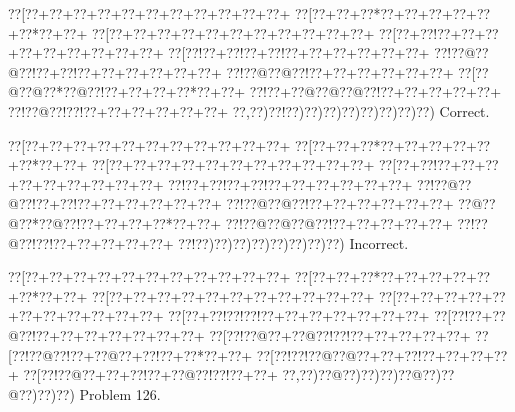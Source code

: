 \documentclass[a5paper]{article}
\begin{document}
\begin{center}
{\goo
\0??[\0??+\0??+\0??+\0??+\0??+\0??+\0??+\0??+\0??+\0??+\0??+
\0??[\0??+\0??+\0??*\0??+\0??+\0??+\0??+\0??+\0??*\0??+\0??+
\0??[\0??+\0??+\0??+\0??+\0??+\0??+\0??+\0??+\0??+\0??+\0??+
\0??[\0??+\0??!\0??+\0??+\0??+\0??+\0??+\0??+\0??+\0??+\0??+
\0??[\0??!\0??+\0??!\0??+\0??!\0??+\0??+\0??+\0??+\0??+\0??+
\0??!\0??@\0??@\0??!\0??+\0??!\0??+\0??+\0??+\0??+\0??+\0??+
\0??!\0??@\0??@\0??!\0??+\0??+\0??+\0??+\0??+\0??+
\0??[\0??@\0??@\0??*\0??@\0??!\0??+\0??+\0??+\0??*\0??+\0??+
\0??!\0??+\0??@\0??@\0??@\0??!\0??+\0??+\0??+\0??+\0??+
\0??!\0??@\0??!\0??!\0??+\0??+\0??+\0??+\0??+\0??+
\0??,\0??)\0??!\0??)\0??)\0??)\0??)\0??)\0??)\0??)\0??)
}
Correct. 

\end{center}
\begin{center}
{\goo
\0??[\0??+\0??+\0??+\0??+\0??+\0??+\0??+\0??+\0??+\0??+\0??+
\0??[\0??+\0??+\0??*\0??+\0??+\0??+\0??+\0??+\0??*\0??+\0??+
\0??[\0??+\0??+\0??+\0??+\0??+\0??+\0??+\0??+\0??+\0??+\0??+
\0??[\0??+\0??!\0??+\0??+\0??+\0??+\0??+\0??+\0??+\0??+\0??+
\0??!\0??+\0??!\0??+\0??!\0??+\0??+\0??+\0??+\0??+\0??+
\0??!\0??@\0??@\0??!\0??+\0??!\0??+\0??+\0??+\0??+\0??+\0??+
\0??!\0??@\0??@\0??!\0??+\0??+\0??+\0??+\0??+\0??+
\0??@\0??@\0??*\0??@\0??!\0??+\0??+\0??+\0??*\0??+\0??+
\0??!\0??@\0??@\0??@\0??!\0??+\0??+\0??+\0??+\0??+
\0??!\0??@\0??!\0??!\0??+\0??+\0??+\0??+\0??+
\0??!\0??)\0??)\0??)\0??)\0??)\0??)\0??)\0??)
}
Incorrect. 

\end{center}
\newpage
\begin{center}
{\goo
\0??[\0??+\0??+\0??+\0??+\0??+\0??+\0??+\0??+\0??+\0??+\0??+
\0??[\0??+\0??+\0??*\0??+\0??+\0??+\0??+\0??+\0??*\0??+\0??+
\0??[\0??+\0??+\0??+\0??+\0??+\0??+\0??+\0??+\0??+\0??+\0??+
\0??[\0??+\0??+\0??+\0??+\0??+\0??+\0??+\0??+\0??+\0??+\0??+
\0??[\0??+\0??!\0??!\0??!\0??+\0??+\0??+\0??+\0??+\0??+\0??+
\0??[\0??!\0??+\0??@\0??!\0??+\0??+\0??+\0??+\0??+\0??+\0??+
\0??[\0??!\0??@\0??+\0??@\0??!\0??!\0??+\0??+\0??+\0??+\0??+
\0??[\0??!\0??@\0??!\0??+\0??@\0??+\0??!\0??+\0??*\0??+\0??+
\0??[\0??!\0??!\0??@\0??@\0??+\0??+\0??!\0??+\0??+\0??+\0??+
\0??[\0??!\0??@\0??+\0??+\0??!\0??+\0??@\0??!\0??!\0??+\0??+
\0??,\0??)\0??@\0??)\0??)\0??)\0??@\0??)\0??@\0??)\0??)\0??)
}
Problem 126.

\end{center}
\end{document}
